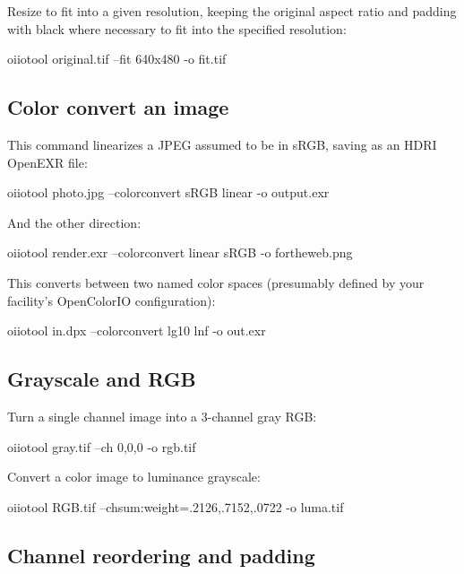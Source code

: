 \noindent Resize to fit into a given resolution, keeping the original
aspect ratio and padding with black where necessary to fit into the
specified resolution:

\begin{code}
    oiiotool original.tif --fit 640x480 -o fit.tif
\end{code}


\subsection*{Color convert an image}

This command linearizes a JPEG assumed to be in sRGB, saving as
an HDRI OpenEXR file:

\begin{code}
    oiiotool photo.jpg --colorconvert sRGB linear -o output.exr
\end{code}

\noindent And the other direction:

\begin{code}
    oiiotool render.exr --colorconvert linear sRGB -o fortheweb.png
\end{code}

\noindent This converts between two named color spaces (presumably
defined by your facility's OpenColorIO configuration):

\begin{code}
    oiiotool in.dpx --colorconvert lg10 lnf -o out.exr
\end{code}


\subsection*{Grayscale and RGB}

\noindent Turn a single channel image into a 3-channel gray RGB:
\begin{code}
    oiiotool gray.tif --ch 0,0,0 -o rgb.tif
\end{code}

\noindent Convert a color image to luminance grayscale:

\begin{code}
    oiiotool RGB.tif --chsum:weight=.2126,.7152,.0722 -o luma.tif
\end{code}

\subsection*{Channel reordering and padding}

